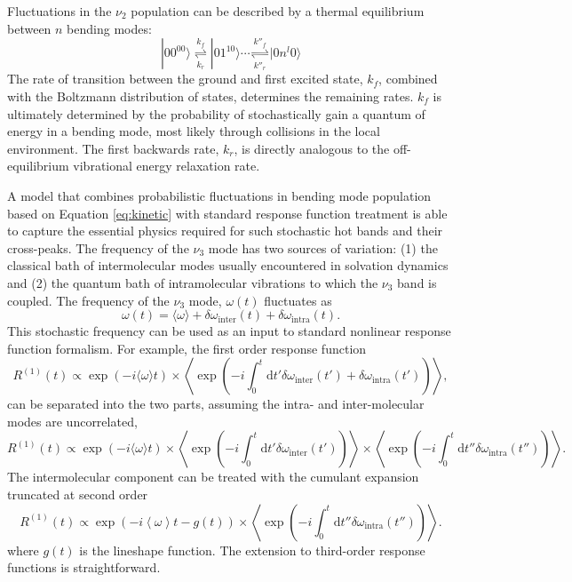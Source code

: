 Fluctuations in the  $\nu_2$ population can be described by a thermal equilibrium between $n$ bending modes:
\begin{equation}
\label{eq:kinetic}
|00^00 \rangle \overset{k_{f}}{\underset{k_{r}}\rightleftharpoons} |01^10 \rangle \cdots \overset{k''_{f}}{\underset{k''_{r}}\rightleftharpoons} |0n^l0 \rangle
\end{equation}
\noindent The rate of transition between the ground and first excited state, $k_f$, combined with the Boltzmann distribution of states, determines the remaining rates. $k_f$ is ultimately determined by the probability of stochastically gain a quantum of energy in a  bending mode, most likely through collisions in the local environment. The first backwards rate, $k_r$, is directly analogous to the off-equilibrium vibrational energy relaxation rate.

A model that combines probabilistic fluctuations in bending mode population based on Equation \ref{eq:kinetic} with standard response function treatment is able to capture the essential physics required for such stochastic hot bands and their cross-peaks. The frequency of the $\nu_3$ mode has two sources of variation: (1) the classical bath of intermolecular modes usually encountered in solvation dynamics and (2) the quantum bath of intramolecular vibrations to which the $\nu_3$ band is coupled. The frequency of the $\nu_3$ mode, $\omega(t)$ fluctuates as 
    \begin{equation}
\label{eq:stochastic_frequency}
\omega(t) = \langle  \omega\rangle + \delta\omega_\mathrm{inter}(t) + \delta\omega_\mathrm{intra}(t).
    \end{equation}
\noindent This stochastic frequency can be used as an input to standard nonlinear response function formalism. For example, the first order response function
\begin{equation}
  \label{eq:R1_1}
  R^{(1)}(t) \propto \exp{\left( -i\langle\omega\rangle t \right)} \times \left\langle \exp{\left(-i\int_0^t \mathrm{d}t' \delta\omega_\mathrm{inter}(t') + \delta\omega_\mathrm{intra}(t')\right)}  \right\rangle,
\end{equation}
\noindent can be separated into the two parts, assuming the intra- and inter-molecular modes are uncorrelated,
\begin{equation}\label{eq:R1_2}
  R^{(1)}(t) \propto \exp{\left( -i \langle \omega \rangle t \right)} \times \left\langle \exp{\left( -i\int_0^t \mathrm{d}t' \delta\omega_\mathrm{inter}(t') \right)}\right\rangle \times \left\langle  \exp{\left( -i\int_0^t \mathrm{d}t''\delta\omega_\mathrm{intra}(t'') \right)} \right\rangle.
\end{equation}
\noindent The intermolecular component can be treated with the cumulant expansion truncated at second order
\begin{equation}
  \label{eq:R1_2b}
  R^{(1)}(t) \propto \exp{\left( -i \left\langle \omega\right\rangle {t} - g(t) \right) } \times \left\langle  \exp{ \left( -i\int_0^t \mathrm{d}t''\delta\omega_\mathrm{intra}(t'') \right)} \right\rangle.
\end{equation}
\noindent where $g(t)$ is the lineshape function. The extension to third-order response functions is straightforward.


